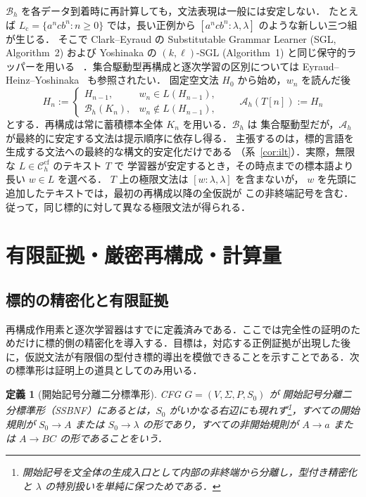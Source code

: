 \documentclass[11pt,a4paper]{ltjsarticle}
\newtheorem{definition}[theorem]{定義}
\theoremstyle{remark}
\theoremstyle{plain}
\newcommand{\cf}{\mathrm{cf}}
\newcommand{\Ccf}[1]{\mathcal C_{#1}^{\cf}}
\begin{document}
$\mathcal B_h$ を各データ到着時に再計算しても，文法表現は一般には安定しない．
たとえば $L_{\mathrm c}=\{a^ncb^n:n\ge0\}$ では，長い正例から
$[a^ncb^n:\lambda,\lambda]$ のような新しい三つ組が生じる．
そこで Clark--Eyraud の Substitutable Grammar Learner (SGL, Algorithm~2)
および Yoshinaka の $(k,\ell)$-SGL (Algorithm~1) と同じ保守的ラッパーを用いる
~\cite{clark-eyraud2007,yoshinaka2008}．集合駆動型再構成と逐次学習の区別については
Eyraud--Heinz--Yoshinaka~\cite[Appendix]{eyraud-heinz-yoshinaka2016} も参照されたい．
固定空文法 $H_0$ から始め，$w_n$ を読んだ後
\[
 H_n:=
 \begin{cases}
 H_{n-1},&w_n\in L(H_{n-1}),\\
 \mathcal B_h(K_n),&w_n\notin L(H_{n-1}),
 \end{cases}
 \qquad
 \mathcal A_h(T[n]):=H_n
\]
とする．再構成は常に蓄積標本全体 $K_n$ を用いる．$\mathcal B_h$ は
集合駆動型だが，$\mathcal A_h$ が最終的に安定する文法は提示順序に依存し得る．
主張するのは，標的言語を生成する文法への最終的な構文的安定化だけである
（系~\ref{cor:ilt}）．実際，無限な $L\in\Ccf{h}$ のテキスト $T$ で
学習器が安定するとき，その時点までの標本語より長い $w\in L$ を選べる．
$T$ 上の極限文法は $[w:\lambda,\lambda]$ を含まないが，
$w$ を先頭に追加したテキストでは，最初の再構成以降の全仮説が
この非終端記号を含む．従って，同じ標的に対して異なる極限文法が得られる．

\section{有限証拠・厳密再構成・計算量}
\label{sec:typing}

\subsection{標的の精密化と有限証拠}

再構成作用素と逐次学習器はすでに定義済みである．ここでは完全性の証明のためだけに標的側の精密化を導入する．目標は，対応する正例証拠が出現した後に，仮説文法が有限個の型付き標的導出を模倣できることを示すことである．次の標準形は証明上の道具としてのみ用いる．

\begin{definition}[開始記号分離二分標準形]
CFG $G=(V,\Sigma,P,S_0)$ が \emph{開始記号分離二分標準形}（SSBNF）にあるとは，$S_0$ がいかなる右辺にも現れず\footnote{開始記号を文全体の生成入口として内部の非終端から分離し，型付き精密化と $\lambda$ の特別扱いを単純に保つためである．}，すべての開始規則が $S_0\to A$ または $S_0\to\lambda$ の形であり，すべての非開始規則が $A\to a$ または $A\to BC$ の形であることをいう．
\end{definition}
\end{document}

